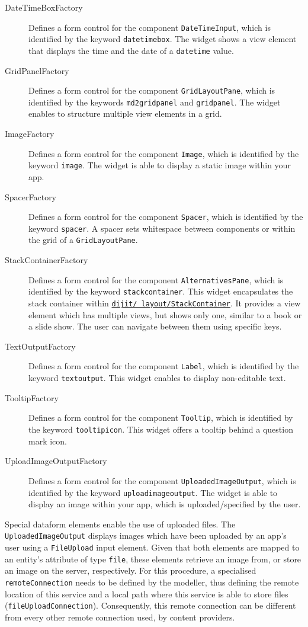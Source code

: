\begin{description}
	\item[DateTimeBoxFactory] Defines a form control for the component \lstinline|DateTimeInput|, which is identified by the keyword \lstinline|datetimebox|. The widget shows a view element that displays the time and the date of a \lstinline|datetime| value.
	\item[GridPanelFactory] Defines a form control for the component \lstinline|GridLayoutPane|, which is identified by the keywords \lstinline|md2gridpanel| and \lstinline|gridpanel|. The widget enables to structure multiple view elements in a grid.
	\item[ImageFactory] Defines a form control for the component \lstinline|Image|, which is identified by the keyword \lstinline|image|. The widget is able to display a static image within your app.
	\item[SpacerFactory] Defines a form control for the component \lstinline|Spacer|, which is identified by the keyword \lstinline|spacer|. A spacer sets whitespace between components or within the grid of a \lstinline|GridLayoutPane|.
	\item[StackContainerFactory] Defines a form control for the component \lstinline|AlternativesPane|, which is identified by the keyword \lstinline|stackcontainer|. This widget encapsulates the stack container within \href{http://dojotoolkit.org/reference-guide/1.10/dijit/layout/StackContainer.html}{\lstinline|dijit/ layout/StackContainer|}. It provides a view element which has multiple views, but shows only one, similar to a book or a slide show. The user can navigate between them using specific keys. 
	\item[TextOutputFactory] Defines a form control for the component \lstinline|Label|, which is identified by the keyword \lstinline|textoutput|. This widget enables to display non-editable text.
	\item[TooltipFactory] Defines a form control for the component \lstinline|Tooltip|, which is identified by the keyword \lstinline|tooltipicon|. This widget offers a tooltip behind a question mark icon.
	\item[UploadImageOutputFactory] Defines a form control for the component \lstinline|UploadedImageOutput|, which is identified by the keyword \lstinline|uploadimageoutput|. The widget is able to display an image within your app, which is uploaded/specified by the user. 
\end{description}

Special dataform elements enable the use of uploaded files. The \lstinline|UploadedImageOutput| displays images which have been uploaded by an app's user using a \lstinline|FileUpload| input element. Given that both elements are mapped to an entity's attribute of type \lstinline|file|, these elements retrieve an image from, or store an image on the server, respectively. For this procedure, a specialised \lstinline|remoteConnection| needs to be defined by the modeller, thus defining the remote location of this service and a local path where this service is able to store files (\lstinline|fileUploadConnection|). Consequently, this remote connection can be different from every other remote connection used, \eg by content providers.

